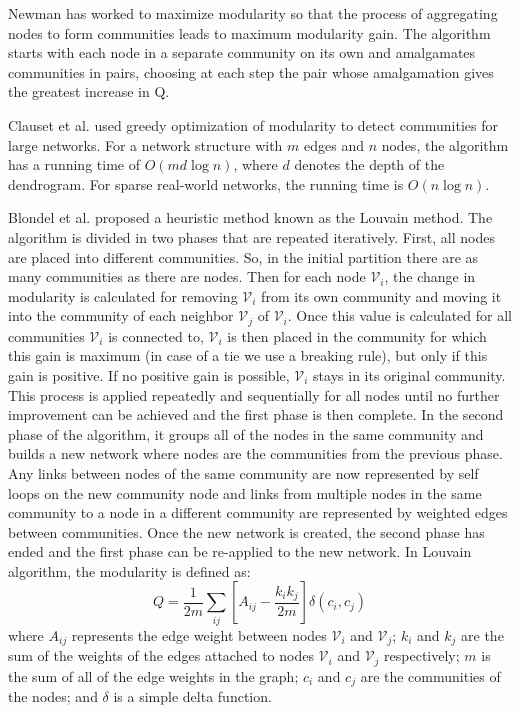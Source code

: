 \documentclass[\main/thesis.tex]{subfiles}
\begin{document}
Newman \cite{newman2004fast} has worked to maximize modularity so that the process of aggregating nodes to form communities leads to maximum modularity gain. The algorithm starts with each node in a separate community on its own and amalgamates communities in pairs, choosing at each step the pair whose amalgamation gives the greatest increase in Q.

Clauset et al. \cite{clauset2004finding} used greedy optimization of modularity to detect communities for large networks. For a network structure with $m$ edges and $n$ nodes, the algorithm has a running time of $O(md \log n)$, where $d$ denotes the depth of the dendrogram. For sparse real-world networks, the running time is $O(n\log n)$.

Blondel et al. \cite{blondel2008fast} proposed a heuristic method known as the Louvain method. The algorithm is divided in two phases that are repeated iteratively. First, all nodes are placed into different communities. So, in the initial partition there are as many communities as there are nodes. Then for each node $\mathcal{V}_i$, the change in modularity is calculated for removing $\mathcal{V}_i$ from its own community and moving it into the community of each neighbor $\mathcal{V}_j$ of $\mathcal{V}_i$. Once this value is calculated for all communities $\mathcal{V}_i$ is connected to, $\mathcal{V}_i$ is then placed in the community for which this gain is maximum (in case of a tie we use a breaking rule), but only if this gain is positive. If no positive gain is possible, $\mathcal{V}_i$ stays in its original community. This process is applied repeatedly and sequentially for all nodes until no further improvement can be achieved and the first phase is then complete. In the second phase of the algorithm, it groups all of the nodes in the same community and builds a new network where nodes are the communities from the previous phase. Any links between nodes of the same community are now represented by self loops on the new community node and links from multiple nodes in the same community to a node in a different community are represented by weighted edges between communities. Once the new network is created, the second phase has ended and the first phase can be re-applied to the new network. In Louvain algorithm, the modularity is defined as: 
\begin{equation}
Q=\frac{1}{2m}\sum_{ij}[A_{ij}-\frac{k_ik_j}{2m}]\delta(c_i,c_j)
\end{equation}
where $A_{ij}$ represents the edge weight between nodes $\mathcal{V}_i$ and $\mathcal{V}_j$; $k_{i}$ and $k_j$ are the sum of the weights of the edges attached to nodes $\mathcal{V}_i$ and $\mathcal{V}_j$ respectively; $m$ is the sum of all of the edge weights in the graph; $c_{i}$ and $c_{j}$ are the communities of the nodes; and $\delta$ is a simple delta function.
\end{document}
